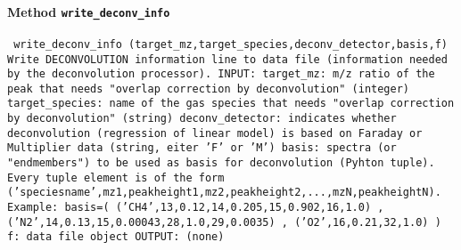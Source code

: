 \paragraph{Method \texttt{write_deconv_info}}
\vspace{1ex}
\texttt{\newline
write_deconv_info (target_mz,target_species,deconv_detector,basis,f)\newline
\newline
Write DECONVOLUTION information line to data file (information needed by the deconvolution processor).\newline
\newline
INPUT:\newline
target_mz: m/z ratio of the peak that needs "overlap correction by deconvolution" (integer)\newline
target_species: name of the gas species that needs "overlap correction by deconvolution" (string)\newline
deconv_detector: indicates whether deconvolution (regression of linear model) is based on Faraday or Multiplier data (string, eiter 'F' or 'M')\newline
basis: spectra (or "endmembers") to be used as basis for deconvolution (Pyhton tuple). Every tuple element is of the form ('speciesname',mz1,peakheight1,mz2,peakheight2,...,mzN,peakheightN). Example: basis=( ('CH4',13,0.12,14,0.205,15,0.902,16,1.0) , ('N2',14,0.13,15,0.00043,28,1.0,29,0.0035) , ('O2',16,0.21,32,1.0) )\newline
f: data file object\newline
\newline
OUTPUT:\newline
(none)\newline
\newline
}

